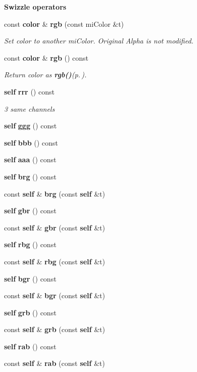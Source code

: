 \begin{Indent}{\bf Swizzle operators}\par
\begin{CompactItemize}
\item 
const {\bf color} \& {\bf rgb} (const mi\-Color \&t)
\begin{CompactList}\small\item\em Set color to another mi\-Color. Original Alpha is not modified. \item\end{CompactList}\item 
const {\bf color} \& {\bf rgb} () const 
\begin{CompactList}\small\item\em Return color as {\bf rgb()}{\rm (p.\,\pageref{structmr_1_1color_z7_0})}. \item\end{CompactList}\item 
{\bf self} {\bf rrr} () const 
\begin{CompactList}\small\item\em 3 same channels \item\end{CompactList}\item 
{\bf self} {\bf ggg} () const 
\item 
{\bf self} {\bf bbb} () const 
\item 
{\bf self} {\bf aaa} () const 
\item 
{\bf self} {\bf brg} () const 
\item 
const {\bf self} \& {\bf brg} (const {\bf self} \&t)
\item 
{\bf self} {\bf gbr} () const 
\item 
const {\bf self} \& {\bf gbr} (const {\bf self} \&t)
\item 
{\bf self} {\bf rbg} () const 
\item 
const {\bf self} \& {\bf rbg} (const {\bf self} \&t)
\item 
{\bf self} {\bf bgr} () const 
\item 
const {\bf self} \& {\bf bgr} (const {\bf self} \&t)
\item 
{\bf self} {\bf grb} () const 
\item 
const {\bf self} \& {\bf grb} (const {\bf self} \&t)
\item 
{\bf self} {\bf rab} () const 
\item 
const {\bf self} \& {\bf rab} (const {\bf self} \&t)
\item 

\end{CompactItemize}
\end{Indent}
